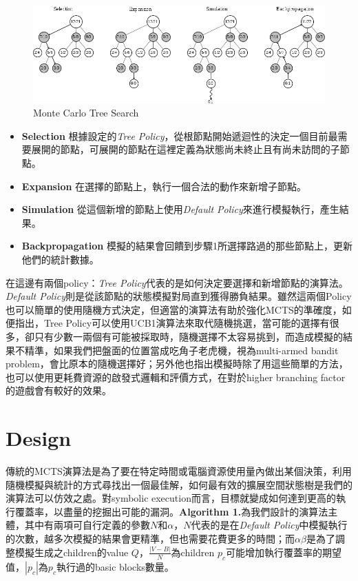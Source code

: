 \documentclass[12pt,a4paper,oneside]{book}
\begin{document}
\begin{figure}[h]
\center
\includegraphics[width=\textwidth,height=\textheight,keepaspectratio]{figures/MCTS.png}
\caption{Monte Carlo Tree Search \label{figMCTS}}
\end{figure}

\begin{itemize}
\item \textbf{Selection} 根據設定的\textit{Tree Policy}，從根節點開始遞迴性的決定一個目前最需要展開的節點，可展開的節點在這裡定義為狀態尚未終止且有尚未訪問的子節點。
\item \textbf{Expansion} 在選擇的節點上，執行一個合法的動作來新增子節點。
\item \textbf{Simulation} 從這個新增的節點上使用\textit{Default Policy}來進行模擬執行，產生結果。
\item \textbf{Backpropagation} 模擬的結果會回饋到步驟1所選擇路過的那些節點上，更新他們的統計數據。
\end{itemize}

在這邊有兩個policy：\textit{Tree Policy}代表的是如何決定要選擇和新增節點的演算法。\textit{Default Policy}則是從該節點的狀態模擬對局直到獲得勝負結果。雖然這兩個Policy也可以簡單的使用隨機方式決定，但適當的演算法有助於強化MCTS的準確度，如\cite{Intro2MCTS}便指出，Tree Policy可以使用UCB1演算法來取代隨機挑選，當可能的選擇有很多，卻只有少數一兩個有可能被採取時，隨機選擇不太容易挑到，而造成模擬的結果不精準，如果我們把盤面的位置當成吃角子老虎機，視為multi-armed bandit problem，會比原本的隨機選擇好；另外他也指出模擬時除了用這些簡單的方法，也可以使用更耗費資源的啟發式邏輯和評價方式，在對於higher branching factor的遊戲會有較好的效果。

\chapter{Design}

傳統的MCTS演算法是為了要在特定時間或電腦資源使用量內做出某個決策，利用隨機模擬與統計的方式尋找出一個最佳解，如何最有效的擴展空間狀態樹是我們的演算法可以仿效之處。對symbolic execution而言，目標就變成如何達到更高的執行覆蓋率，以盡量的挖掘出可能的漏洞。\textbf{Algorithm 1.}為我們設計的演算法主體，其中有兩項可自行定義的參數$N$和$\alpha$，$N$代表的是在\textit{Default Policy}中模擬執行的次數，越多次模擬的結果會更精準，但也需要花費更多的時間；而$\alpha \beta$是為了調整模擬生成之children的value $Q$，$\frac{|V-B|}{N}$為children $p_c$可能增加執行覆蓋率的期望值，$|p_c|$為$p_c$執行過的basic blocks數量。
\end{document}
